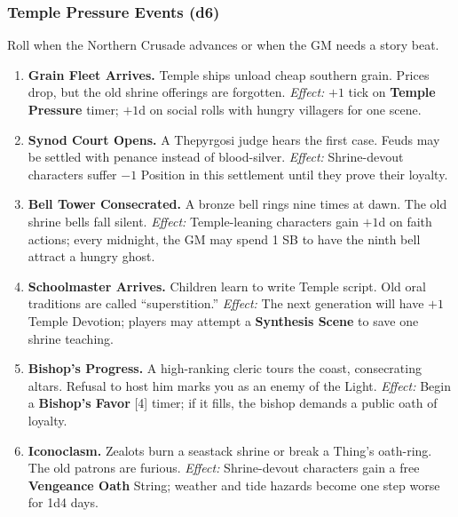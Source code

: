 \subsubsection*{Temple Pressure Events (d6)}
Roll when the Northern Crusade advances or when the GM needs a story beat.
\begin{enumerate}[label=\arabic*., wide=0pt]
    \item \textbf{Grain Fleet Arrives.} Temple ships unload cheap southern grain. Prices drop, but the old shrine offerings are forgotten. \textit{Effect:} $+1$ tick on \textbf{Temple Pressure} timer; $+1$d on social rolls with hungry villagers for one scene.
    \item \textbf{Synod Court Opens.} A Thepyrgosi judge hears the first case. Feuds may be settled with penance instead of blood-silver. \textit{Effect:} Shrine-devout characters suffer $-1$ Position in this settlement until they prove their loyalty.
    \item \textbf{Bell Tower Consecrated.} A bronze bell rings nine times at dawn. The old shrine bells fall silent. \textit{Effect:} Temple-leaning characters gain $+1$d on faith actions; every midnight, the GM may spend 1 SB to have the ninth bell attract a hungry ghost.
    \item \textbf{Schoolmaster Arrives.} Children learn to write Temple script. Old oral traditions are called ``superstition.'' \textit{Effect:} The next generation will have $+1$ Temple Devotion; players may attempt a \textbf{Synthesis Scene} to save one shrine teaching.
    \item \textbf{Bishop's Progress.} A high-ranking cleric tours the coast, consecrating altars. Refusal to host him marks you as an enemy of the Light. \textit{Effect:} Begin a \textbf{Bishop's Favor} [4] timer; if it fills, the bishop demands a public oath of loyalty.
    \item \textbf{Iconoclasm.} Zealots burn a seastack shrine or break a Thing's oath-ring. The old patrons are furious. \textit{Effect:} Shrine-devout characters gain a free \textbf{Vengeance Oath} String; weather and tide hazards become one step worse for 1d4 days.
\end{enumerate}

